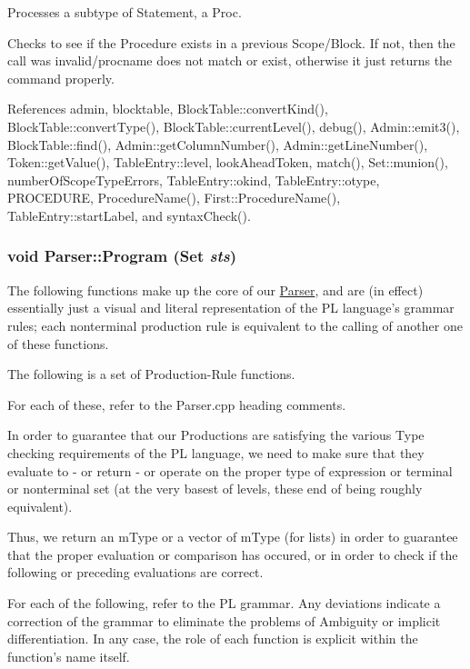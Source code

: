 Processes a subtype of Statement, a Proc. 

Checks to see if the Procedure exists in a previous Scope/Block. If not, then the call was invalid/procname does not match or exist, otherwise it just returns the command properly. 

References admin, blocktable, BlockTable::convertKind(), BlockTable::convertType(), BlockTable::currentLevel(), debug(), Admin::emit3(), BlockTable::find(), Admin::getColumnNumber(), Admin::getLineNumber(), Token::getValue(), TableEntry::level, lookAheadToken, match(), Set::munion(), numberOfScopeTypeErrors, TableEntry::okind, TableEntry::otype, PROCEDURE, ProcedureName(), First::ProcedureName(), TableEntry::startLabel, and syntaxCheck().

\hypertarget{classParser_a068fd2e519704d6fbaf9c8ecb3469e49}{
\subsubsection[{Program}]{\setlength{\rightskip}{0pt plus 5cm}void Parser::Program ({\bf Set} {\em sts})}}
\label{classParser_a068fd2e519704d6fbaf9c8ecb3469e49}


The following functions make up the core of our \hyperlink{classParser}{Parser}, and are (in effect) essentially just a visual and literal representation of the PL language's grammar rules; each nonterminal production rule is equivalent to the calling of another one of these functions. 

The following is a set of Production-\/Rule functions.

For each of these, refer to the Parser.cpp heading comments.

In order to guarantee that our Productions are satisfying the various Type checking requirements of the PL language, we need to make sure that they evaluate to -\/ or return -\/ or operate on the proper type of expression or terminal or nonterminal set (at the very basest of levels, these end of being roughly equivalent).

Thus, we return an mType or a vector of mType (for lists) in order to guarantee that the proper evaluation or comparison has occured, or in order to check if the following or preceding evaluations are correct.

For each of the following, refer to the PL grammar. Any deviations indicate a correction of the grammar to eliminate the problems of Ambiguity or implicit differentiation. In any case, the role of each function is explicit within the function's name itself.


